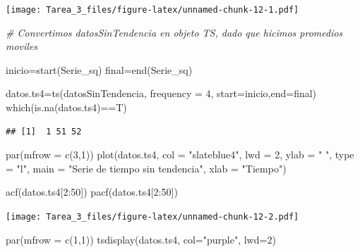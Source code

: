 \documentclass[
]{article}
\newenvironment{Shaded}{\begin{snugshade}}{\end{snugshade}}
\newcommand{\AttributeTok}[1]{\textcolor[rgb]{0.77,0.63,0.00}{#1}}
\newcommand{\CommentTok}[1]{\textcolor[rgb]{0.56,0.35,0.01}{\textit{#1}}}
\newcommand{\DecValTok}[1]{\textcolor[rgb]{0.00,0.00,0.81}{#1}}
\newcommand{\FunctionTok}[1]{\textcolor[rgb]{0.00,0.00,0.00}{#1}}
\newcommand{\NormalTok}[1]{#1}
\newcommand{\OtherTok}[1]{\textcolor[rgb]{0.56,0.35,0.01}{#1}}
\newcommand{\SpecialCharTok}[1]{\textcolor[rgb]{0.00,0.00,0.00}{#1}}
\newcommand{\StringTok}[1]{\textcolor[rgb]{0.31,0.60,0.02}{#1}}
\begin{document}
\texttt{[image: Tarea\_3\_files/figure-latex/unnamed-chunk-12-1.pdf]}

\begin{Shaded}
\begin{Highlighting}[]
\CommentTok{\# Convertimos datosSinTendencia en objeto TS, dado que hicimos promedios moviles}

\NormalTok{inicio}\OtherTok{=}\FunctionTok{start}\NormalTok{(Serie\_sq)}
\NormalTok{final}\OtherTok{=}\FunctionTok{end}\NormalTok{(Serie\_sq)}

\NormalTok{datos.ts4}\OtherTok{=}\FunctionTok{ts}\NormalTok{(datosSinTendencia, }\AttributeTok{frequency =} \DecValTok{4}\NormalTok{, }\AttributeTok{start=}\NormalTok{inicio,}\AttributeTok{end=}\NormalTok{final) }
\FunctionTok{which}\NormalTok{(}\FunctionTok{is.na}\NormalTok{(datos.ts4)}\SpecialCharTok{==}\NormalTok{T)}
\end{Highlighting}
\end{Shaded}

\begin{verbatim}
## [1]  1 51 52
\end{verbatim}

\begin{Shaded}
\begin{Highlighting}[]
\FunctionTok{par}\NormalTok{(}\AttributeTok{mfrow =} \FunctionTok{c}\NormalTok{(}\DecValTok{3}\NormalTok{,}\DecValTok{1}\NormalTok{))}
\FunctionTok{plot}\NormalTok{(datos.ts4, }\AttributeTok{col =} \StringTok{"slateblue4"}\NormalTok{, }\AttributeTok{lwd =} \DecValTok{2}\NormalTok{, }\AttributeTok{ylab =} \StringTok{" "}\NormalTok{, }\AttributeTok{type =} \StringTok{"l"}\NormalTok{,}
     \AttributeTok{main =} \StringTok{"Serie de tiempo sin tendencia"}\NormalTok{, }\AttributeTok{xlab =} \StringTok{"Tiempo"}\NormalTok{)}

\FunctionTok{acf}\NormalTok{(datos.ts4[}\DecValTok{2}\SpecialCharTok{:}\DecValTok{50}\NormalTok{])}
\FunctionTok{pacf}\NormalTok{(datos.ts4[}\DecValTok{2}\SpecialCharTok{:}\DecValTok{50}\NormalTok{])}
\end{Highlighting}
\end{Shaded}

\texttt{[image: Tarea\_3\_files/figure-latex/unnamed-chunk-12-2.pdf]}

\begin{Shaded}
\begin{Highlighting}[]
\FunctionTok{par}\NormalTok{(}\AttributeTok{mfrow =} \FunctionTok{c}\NormalTok{(}\DecValTok{1}\NormalTok{,}\DecValTok{1}\NormalTok{))}
\FunctionTok{tsdisplay}\NormalTok{(datos.ts4, }\AttributeTok{col=}\StringTok{"purple"}\NormalTok{, }\AttributeTok{lwd=}\DecValTok{2}\NormalTok{)}
\end{Highlighting}
\end{Shaded}
\end{document}

